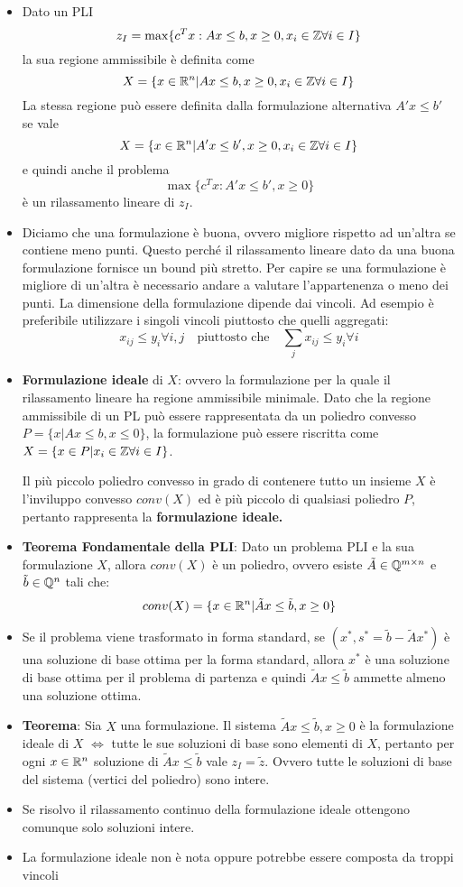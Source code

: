 \begin{itemize}
	\item Dato un PLI
	$$
	z_I = \max \{ c^Tx : Ax \leq b, x \geq 0, x_i \in \mathbb{Z} \forall i \in I\}
	$$
	la sua regione ammissibile è definita come
	$$
	X = \{ x \in \mathbb{R}^n | Ax \leq b, x \geq 0, x_i \in \mathbb{Z} \forall i \in I \}
	$$
	La stessa regione può essere definita dalla formulazione alternativa $A'x \leq b'$ se vale
	$$
	X = \{ x \in \mathbb{R}^n | A'x \leq b', x \geq 0, x_i \in \mathbb{Z} \forall i \in I \}
	$$
	e quindi anche il problema
	$$
	\max \{ c^Tx: A'x \leq b', x\geq 0 \}
	$$
	è un rilassamento lineare di $z_I$.
	\item Diciamo che una formulazione è buona, ovvero migliore rispetto ad un'altra se contiene meno punti. Questo perché il rilassamento lineare dato da una buona formulazione fornisce un bound più stretto. Per capire se una formulazione è migliore di un'altra è necessario andare a valutare l'appartenenza o meno dei punti. La dimensione della formulazione dipende dai vincoli. Ad esempio è preferibile utilizzare i singoli vincoli piuttosto che quelli aggregati:
	$$
	x_{ij} \leq y_i \forall i,j \quad\text{piuttosto che}\quad \sum_{j}x_{ij}\leq y_i \forall i
	$$
	\item \textbf{Formulazione ideale} di $X$: ovvero la formulazione per la quale il rilassamento lineare ha regione ammissibile minimale.
	Dato che la regione ammissibile di un PL può essere rappresentata da un poliedro convesso $P = \{x | Ax \leq b, x \leq 0 \}$, la formulazione può essere riscritta come $X = \{ x \in P | x_i \in \mathbb{Z} \forall i \in I \}$.
	
	Il più piccolo poliedro convesso in grado di contenere tutto un insieme $X$ è l'inviluppo convesso $conv(X)$ ed è più piccolo di qualsiasi poliedro $P$, pertanto rappresenta la \textbf{formulazione ideale.}
	
	\item \textbf{Teorema Fondamentale della PLI}: Dato un problema PLI e la sua formulazione $X$, allora $conv(X)$ è un poliedro, ovvero esiste $\tilde{A} \in \mathbb{Q}^{m \times n}$ e $\tilde{b} \in \mathbb{Q}^n$ tali che:
	$$
	conv(X) = \{ x \in \mathbb{R}^n | \tilde{A}x \leq \tilde{b}, x \geq 0 \}
	$$
	\item Se il problema viene trasformato in forma standard, se $(x^*, s^* = \tilde{b} - \tilde{A}x^*)$ è una soluzione di base ottima per la forma standard, allora $x^*$ è una soluzione di base ottima per il problema di partenza e quindi $\tilde{A}x \leq \tilde{b}$ ammette almeno una soluzione ottima.
	\item \textbf{Teorema}: Sia $X$ una formulazione. Il sistema $\tilde{A}x \leq \tilde{b}, x\geq 0$ è la formulazione ideale di $X$ $\Leftrightarrow$ tutte le sue soluzioni di base sono elementi di $X$, pertanto per ogni $x \in \mathbb{R}^n$ soluzione di $\tilde{A}x \leq \tilde{b}$ vale $z_I = \tilde{z}$. Ovvero tutte le soluzioni di base del sistema (vertici del poliedro) sono intere.
	\item Se risolvo il rilassamento continuo della formulazione ideale ottengono comunque solo soluzioni intere.
	\item La formulazione ideale non è nota oppure potrebbe essere composta da troppi vincoli
\end{itemize}

